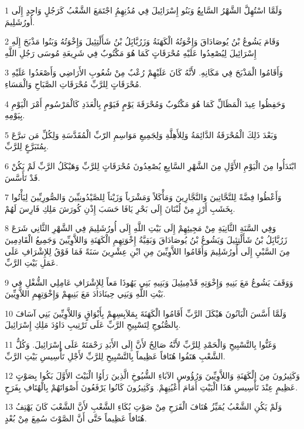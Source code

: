 \par 1 وَلَمَّا اسْتُهِلَّ الشَّهْرُ السَّابِعُ وَبَنُو إِسْرَائِيلَ فِي مُدُنِهِمُِ اجْتَمَعَ الشَّعْبُ كَرَجُلٍ وَاحِدٍ إِلَى أُورُشَلِيمَ.
\par 2 وَقَامَ يَشُوعُ بْنُ يُوصَادَاقَ وَإِخْوَتُهُ الْكَهَنَةُ وَزَرُبَّابَِلُ بْنُ شَأَلْتِئِيلَ وَإِخْوَتُهُ وَبَنُوا مَذْبَحَ إِلَهِ إِسْرَائِيلَ لِيُصْعِدُوا عَلَيْهِ مُحْرَقَاتٍ كَمَا هُوَ مَكْتُوبٌ فِي شَرِيعَةِ مُوسَى رَجُلِ اللَّهِ
\par 3 وَأَقَامُوا الْمَذْبَحَ فِي مَكَانِهِ. لأَنَّهُ كَانَ عَلَيْهِمْ رُعْبٌ مِنْ شُعُوبِ الأَرَاضِي وَأَصْعَدُوا عَلَيْهِ مُحْرَقَاتٍ لِلرَّبِّ مُحْرَقَاتِ الصَّبَاحِ وَالْمَسَاءِ.
\par 4 وَحَفِظُوا عِيدَ الْمَظَالِّ كَمَا هُوَ مَكْتُوبٌ وَمُحْرَقَةَ يَوْمٍ فَيَوْمٍ بِالْعَدَدِ كَالْمَرْسُومِ أَمْرَ الْيَوْمِ بِيَوْمِهِ.
\par 5 وَبَعْدَ ذَلِكَ الْمُحْرَقَةُ الدَّائِمَةُ وَلِلأَهِلَّةِ وَلِجَمِيعِ مَوَاسِمِ الرّبِّ الْمُقَدَّسَةِ وَلِكُلِّ مَن تبرَّعَ بِمُتَبَرَّعٍ لِلرَّبِّ.
\par 6 ابْتَدَأُوا مِنَ الْيَوْمِ الأَوَّلِ مِنَ الشَّهْرِ السَّابِعِ يُصْعِدُونَ مُحْرَقَاتٍ لِلرَّبِّ وَهَيْكَلُ الرَّبِّ لَمْ يَكُنْ قَدْ تَأَسَّسَ.
\par 7 وَأَعْطُوا فِضَّةً لِلنَّحَّاتِينَ وَالنَّجَّارِينَ وَمَأْكَلاً وَمَشْرَباً وَزَيْتاً لِلصَّيْدُونِيِّينَ وَالصُّورِيِّينَ لِيَأْتُوا بِخَشَبِ أَرْزٍ مِنْ لُبْنَانَ إِلَى بَحْرِ يَافَا حَسَبَ إِذْنِ كُورَشَ مَلِكِ فَارِسَ لَهُمْ.
\par 8 وَفِي السَّنَةِ الثَّانِيَةِ مِنْ مَجِيئِهِمْ إِلَى بَيْتِ اللَّهِ إِلَى أُورُشَلِيمَ فِي الشَّهْرِ الثَّانِي شَرَعَ زَرُبَّابَِلُ بْنُ شَأَلْتِئِيلَ وَيَشُوعُ بْنُ يُوصَادَاقَ وَبَقِيَّةُ إِخْوَتِهِمِ الْكَهَنَةِ وَاللاَّوِيِّينَ وَجَمِيعُ الْقَادِمِينَ مِنَ السَّبْيِ إِلَى أُورُشَلِيمَ وَأَقَامُوا اللاَّوِيِّينَ مِنِ ابْنِ عِشْرِينَ سَنَةً فَمَا فَوْقُ لِلإِشْرَافِ عَلَى عَمَلِ بَيْتِ الرَّبِّ.
\par 9 وَوَقَفَ يَشُوعُ مَعَ بَنِيهِ وَإِخْوَتِهِ قَدْمِيئِيلَ وَبَنِيهِ بَنِي يَهُوذَا مَعاً لِلإِشْرَافِ عَامِلِي الشُّغْلِ فِي بَيْتِ اللَّهِ وَبَنِي حِينَادَادَ مَعَ بَنِيهِمْ وَإِخْوَتِهِمِ اللاَّوِيِّينَ.
\par 10 وَلَمَّا أَسَّسَ الْبَانُونَ هَيْكَلَ الرَّبِّ أَقَامُوا الْكَهَنَةَ بِمَلاَبِسِهِمْ بِأَبْوَاقٍ وَاللاَّوِيِّينَ بَنِي آسَافَ بِالصُّنُوجِ لِتَسْبِيحِ الرَّبِّ عَلَى تَرْتِيبِ دَاوُدَ مَلِكِ إِسْرَائِيلَ.
\par 11 وَغَنُّوا بِالتَّسْبِيحِ وَالْحَمْدِ لِلرَّبِّ لأَنَّهُ صَالِحٌ لأَنَّ إِلَى الأَبَدِ رَحْمَتَهُ عَلَى إِسْرَائِيلَ. وَكُلُّ الشَّعْبِ هَتَفُوا هُتَافاً عَظِيماً بِالتَّسْبِيحِ لِلرَّبِّ لأَجْلِ تَأْسِيسِ بَيْتِ الرَّبِّ.
\par 12 وَكَثِيرُونَ مِنَ الْكَهَنَةِ وَاللاَّوِيِّينَ وَرُؤُوسِ الآبَاءِ الشُّيُوخِ الَّذِينَ رَأَوُا الْبَيْتَ الأَوَّلَ بَكُوا بِصَوْتٍ عَظِيمٍ عِنْدَ تَأْسِيسِ هَذَا الْبَيْتِ أَمَامَ أَعْيُنِهِمْ. وَكَثِيرُونَ كَانُوا يَرْفَعُونَ أَصْوَاتَهُمْ بِالْهُتَافِ بِفَرَحٍ.
\par 13 وَلَمْ يَكُنِ الشَّعْبُ يُمَيِّزُ هُتَافَ الْفَرَحِ مِنْ صَوْتِ بُكَاءِ الشَّعْبِ لأَنَّ الشَّعْبَ كَانَ يَهْتِفُ هُتَافاً عَظِيماً حَتَّى أَنَّ الصَّوْتَ سُمِعَ مِنْ بُعْدٍ.

